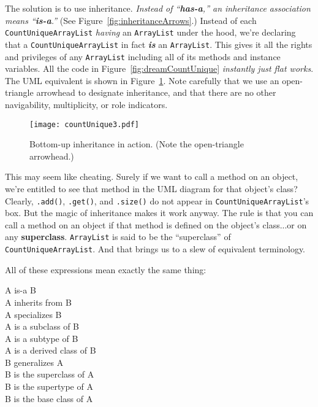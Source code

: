 The solution is to use inheritance. \textit{Instead of ``\textbf{has-a},'' an
inheritance association means ``\textbf{is-a}.''} (See
Figure~\ref{fig:inheritanceArrows}.) Instead of each
\texttt{CountUniqueArrayList} \textit{having} an \texttt{ArrayList} under the
hood, we're declaring that a \texttt{CountUniqueArrayList} in fact
\textbf{\textit{is}} an \texttt{ArrayList}. This gives it all the rights and
privileges of any \texttt{ArrayList} including all of its methods and instance
variables. All the code in Figure~\ref{fig:dreamCountUnique} \textit{instantly
just flat works}. The UML equivalent is shown in
Figure~\ref{fig:countUnique3}. Note carefully that we use an open-triangle
arrowhead to designate inheritance, and that there are no other navigability,
multiplicity, or role indicators.

\begin{figure}[h]
\centering
\texttt{[image: countUnique3.pdf]}
\caption{Bottom-up inheritance in action. (Note the open-triangle arrowhead.)}
\label{fig:countUnique3}
\end{figure}

This may seem like cheating. Surely if we want to call a method on an object,
we're entitled to see that method in the UML diagram for that object's class?
Clearly, \texttt{.add()}, \texttt{.get()}, and \texttt{.size()} do not appear
in \texttt{CountUniqueArrayList}'s box. But the magic of inheritance makes it
work anyway. The rule is that you can call a method on an object if that
method is defined on the object's class...or on any \textbf{superclass}.
\texttt{ArrayList} is said to be the ``superclass'' of
\texttt{CountUniqueArrayList}. And that brings us to a slew of equivalent
terminology.

\begin{samepage}
All of these expressions mean exactly the same thing:
\begin{center}
\small
A is-a B\\
A inherits from B\\
A specializes B\\
A is a subclass of B\\
A is a subtype of B\\
A is a derived class of B\\
B generalizes A\\
B is the superclass of A\\
B is the supertype of A\\
B is the base class of A\\
\end{center}
\end{samepage}

